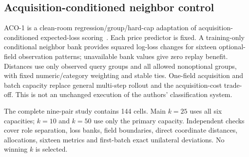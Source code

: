 \subsection{Acquisition-conditioned neighbor control}
ACO-1 is a clean-room regression/group/hard-cap adaptation of
acquisition-conditioned expected-loss scoring~\cite{valancius2024aco}.
Each price predictor is fixed. A training-only conditional neighbor bank
provides squared log-loss changes for sixteen optional-field observation
patterns; unavailable bank values give zero replay benefit. Distances use
only observed query groups and all allowed nonoptional groups, with fixed
numeric/category weighting and stable ties. One-field acquisition and
batch capacity replace general multi-step rollout and the acquisition-cost
trade-off. This is not an unchanged execution of the authors' classification system.

The complete nine-pair study contains 144 cells. Main $k=25$ uses all six
capacities; $k=10$ and $k=50$ use only the primary capacity. Independent
checks cover role separation, loss banks, field boundaries, direct coordinate
distances, allocations, sixteen metrics and first-batch exact unilateral
deviations. No winning $k$ is selected.

